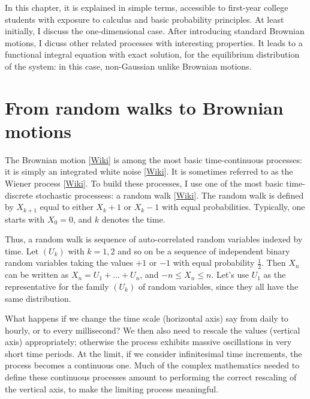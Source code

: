 \documentclass[oneside,10pt]{book}
\begin{document}
In this chapter, it is explained in simple terms, accessible to first-year college students with exposure to calculus and basic probability principles. At least initially, I discuss the one-dimensional case. After introducing standard Brownian motions, I dicuss other related processes
 with interesting properties. It leads to a functional integral equation with exact solution, for the equilibrium distribution of the system: in this case, non-Gaussian unlike Brownian motions.

\section{From random walks to Brownian motions}\label{bmrwp}

The \textcolor{index}{Brownian motion} [\href{https://en.wikipedia.org/wiki/Brownian_motion}{Wiki}] is among the most basic time-continuous processes: it is simply an integrated \textcolor{index}{white noise} [\href{https://en.wikipedia.org/wiki/White_noise}{Wiki}]. It is sometimes referred to as the \textcolor{index}{Wiener process} [\href{https://en.wikipedia.org/wiki/Wiener_process}{Wiki}]. 
To build these processes, I use one of  the most basic time-discrete stochastic processess:  a \textcolor{index}{random walk} [\href{https://en.wikipedia.org/wiki/Random_walk}{Wiki}].  The random walk is defined by $X_{k+1}$ equal to either $X_k + 1$ or $X_k -1$ with equal probabilities. Typically, one starts with $X_0=0$, and $k$ denotes the time. 

Thus, a random walk is sequence of auto-correlated random variables indexed by time. Let $(U_k)$ with $k=1,2$ and so on be a sequence of independent binary random variables taking the values $+1$ or $-1$
 with equal probability $\frac{1}{2}$. Then $X_n$ can be written as $X_n = U_1 + \dots + U_n$, and $-n\leq X_n\leq n$. Let's use $U_1$ as the representative for the family $(U_k)$ of random variables, since they all have the same distribution.


What happens if we change the time scale (horizontal axis) say from daily to hourly, or to every millisecond? We then also need to rescale the values (vertical axis) appropriately; otherwise the process exhibits massive oscillations in very short time periods. At the limit, if we consider infinitesimal time increments, the process becomes a continuous one. Much of the complex mathematics needed to define these continuous processes amount to performing the correct rescaling of the vertical axis, to make the limiting process meaningful. 
\end{document}
